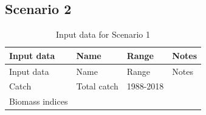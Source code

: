 \documentclass[
]{article}
\begin{document}
\hypertarget{scenario-2}{%
\subsection{Scenario 2}\label{scenario-2}}

\begin{longtable}[]{@{}llll@{}}
\caption{Input data for Scenario 1}\tabularnewline
\toprule
\begin{minipage}[b]{0.21\columnwidth}\raggedright
Input data\strut
\end{minipage} & \begin{minipage}[b]{0.20\columnwidth}\raggedright
Name\strut
\end{minipage} & \begin{minipage}[b]{0.15\columnwidth}\raggedright
Range\strut
\end{minipage} & \begin{minipage}[b]{0.33\columnwidth}\raggedright
Notes\strut
\end{minipage}\tabularnewline
\midrule
\endfirsthead
\toprule
\begin{minipage}[b]{0.21\columnwidth}\raggedright
Input data\strut
\end{minipage} & \begin{minipage}[b]{0.20\columnwidth}\raggedright
Name\strut
\end{minipage} & \begin{minipage}[b]{0.15\columnwidth}\raggedright
Range\strut
\end{minipage} & \begin{minipage}[b]{0.33\columnwidth}\raggedright
Notes\strut
\end{minipage}\tabularnewline
\midrule
\endhead
\begin{minipage}[t]{0.21\columnwidth}\raggedright
Catch\strut
\end{minipage} & \begin{minipage}[t]{0.20\columnwidth}\raggedright
Total catch\strut
\end{minipage} & \begin{minipage}[t]{0.15\columnwidth}\raggedright
1988-2018\strut
\end{minipage} & \begin{minipage}[t]{0.33\columnwidth}\raggedright
\strut
\end{minipage}\tabularnewline
\begin{minipage}[t]{0.21\columnwidth}\raggedright
Biomass indices\strut
\end{minipage} & \begin{minipage}[t]{0.20\columnwidth}\raggedright

\end{minipage}
\end{longtable}
\end{document}
